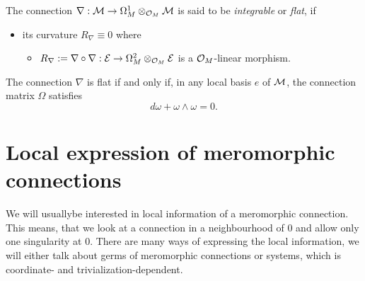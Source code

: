 \begin{defn}[Flatness (0.12.2)]
  The connection $\nabla:\mathcal{M}\to \Omega_M^1\otimes_{\mathcal{O}_M}\mathcal{M}$ is said to be
  \emph{integrable} or \emph{flat}, if
  \begin{itemize}
    \item its curvature $R_\nabla\equiv0$
    where
    \begin{itemize}
      \item $R_\nabla:=\nabla\circ\nabla:\mathcal{E}\to\Omega_M^2\otimes_{\mathcal{O}_M}\mathcal{E}$
        is a $\mathcal{O}_M$-linear morphism.
    \end{itemize}
  \end{itemize}
  \begin{prop}[0.12.4]
    The connection $\nabla$ is flat if and only if, in any local basis $e$ of
    $\mathcal{M}$, the connection matrix $\Omega$ satisfies
    \[
      d\omega + \omega \wedge \omega = 0.
    \]
  \end{prop}
  \begin{comment}
    We will say that a connection on a meromorphic bundle is \emph{integrable}
    or \emph{flat} if its restriction to $M\backslash Z$ is an integrable
    connection on the holomorphic bundle $\sM_{|M\backslash Z}$.
  \end{comment}
\end{defn}

\section{Local expression of meromorphic connections}
\begin{comment}
  \begin{itemize}
    \item \cite{sabbah2007isomonodromic} p.28
    \item \cite{thboalch} p.2
    \item \cite{babbitt1989local} p. 11
  \end{itemize}
\end{comment}
We will usually\TODO[only?] be interested in local information of a meromorphic
connection.  This means, that we look at a connection in a neighbourhood of $0$
and allow only one singularity at $0$.
There are many ways of expressing the local information, we will either talk
about germs of meromorphic connections or systems, which is coordinate-
and trivialization-dependent.

